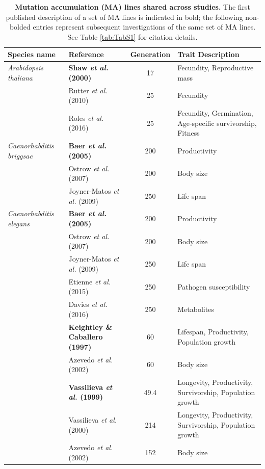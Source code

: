 \newpage
\begin{table}[!h]
    \centering
    \renewcommand{\arraystretch}{1.3}
    \scriptsize
        \caption[Mutation accumulation (MA) lines shared across studies.]{\textbf{Mutation accumulation (MA) lines shared across studies.} The first published description of a set of MA lines is indicated in bold; the following non-bolded entries represent subsequent investigations of the same set of MA lines. See Table \ref{tab:TabS1} for citation details.}
    \begin{tabular}{llcl}
    \toprule
    Species name & Reference & Generation & Trait Description\\
    \midrule
\textit{Arabidopsis thaliana }
    & \textbf{Shaw \textit{et al.} (2000)} & 17 & Fecundity, Reproductive mass\\
    & Rutter \textit{et al.} (2010) & 25 & Fecundity \\
    & Roles \textit{et al.} (2016) & 25 & Fecundity, Germination, Age-specific survivorship, Fitness\\
    \midrule
\textit{Caenorhabditis briggsae} 
    & \textbf{Baer \textit{et al.} (2005)} & 200 & Productivity\\
    & Ostrow \textit{et al.} (2007) & 200 & Body size\\
    & Joyner-Matos \textit{et al.} (2009) & 250 & Life span\\
    \midrule
\textit{Caenorhabditis elegans}
    & \textbf{Baer \textit{et al.} (2005)} & 200 & Productivity\\
    & Ostrow \textit{et al.} (2007) & 200 & Body size\\
    & Joyner-Matos \textit{et al.} (2009) & 250 & Life span\\
    & Etienne \textit{et al.} (2015) & 250 & Pathogen susceptibility\\
    & Davies \textit{et al.} (2016) & 250 & Metabolites\\
    & \textbf{Keightley \& Caballero (1997)} & 60 & Lifespan, Productivity, Population growth\\
    & Azevedo \textit{et al.} (2002) & 60 & Body size\\
    & \textbf{Vassilieva \textit{et al.} (1999)} & 49.4 & Longevity, Productivity, Survivorship, Population growth\\
    & Vassilieva \textit{et al.} (2000) & 214 & Longevity, Productivity, Survivorship, Population growth\\
    & Azevedo \textit{et al.} (2002) & 152 & Body size\\

\end{tabular}
\end{table}
